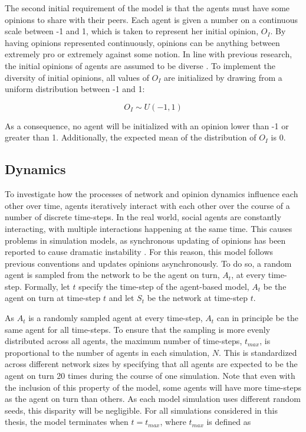 \documentclass[11pt]{article}
\begin{document}
The second initial requirement of the model is that the agents must have some opinions to share with their peers. Each agent is given a number on a continuous scale between -1 and 1, which is taken to represent her initial opinion, $O_I$. By having opinions represented continuously, opinions can be anything between extremely pro or extremely against some notion. 
In line with previous research, the initial opinions of agents are assumed to be diverse \cite{galesic_integrating_2021, flache_models_2017, flache_between_2018}. To implement the diversity of initial opinions, all values of $O_I$ are initialized by drawing from a uniform distribution between -1 and 1: 

$$O_I \sim U(-1, 1)$$

\noindent As a consequence, no agent will be initialized with an opinion lower than -1 or greater than 1. Additionally, the expected mean of the distribution of $O_I$ is 0.

\subsection{Dynamics}
\label{dynamics}
To investigate how the processes of network and opinion dynamics influence each other over time, agents iteratively interact with each other over the course of a number of discrete time-steps. 
In the real world, social agents are constantly interacting, with multiple interactions happening at the same time. This causes problems in simulation models, as synchronous updating of opinions has been reported to cause dramatic instability \cite{flache_models_2017, sasahara_social_2021, galesic_integrating_2021}. For this reason, this model follows previous conventions and updates opinions asynchronously. To do so, a random agent is sampled from the network to be the agent on turn, $A_t$, at every time-step. 
Formally, let $t$ specify the time-step of the agent-based model, $A_t$ be the agent on turn at time-step $t$ and let $S_t$ be the network at time-step $t$.

As $A_t$ is a randomly sampled agent at every time-step, $A_t$ can in principle be the same agent for all time-steps. To ensure that the sampling is more evenly distributed across all agents, the maximum number of time-steps, $t_{max}$, is proportional to the number of agents in each simulation, $N$. This is standardized across different network sizes by specifying that all agents are expected to be the agent on turn 20 times during the course of one simulation. Note that even with the inclusion of this property of the model, some agents will have more time-steps as the agent on turn than others. As each model simulation uses different random seeds, this disparity will be negligible. For all simulations considered in this thesis, the model terminates when $t = t_{max}$, where $t_{max}$ is defined as 
\end{document}
